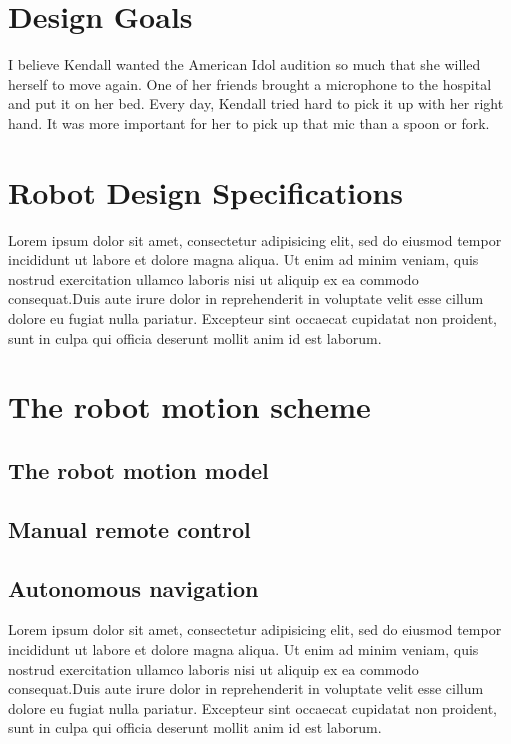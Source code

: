 \documentclass[twocolumn]{article}
\begin{document}
    \section{Design Goals}
    I believe Kendall wanted the American Idol audition so much that she willed herself to move again. One of her friends brought a microphone to the hospital and put it on her bed. Every day, Kendall tried hard to pick it up with her right hand. It was more important for her to pick up that mic than a spoon or fork.
    
    \section{Robot Design Specifications}
        Lorem ipsum dolor sit amet, consectetur adipisicing elit, sed do eiusmod
        tempor incididunt ut labore et dolore magna aliqua. Ut enim ad minim veniam,
        quis nostrud exercitation ullamco laboris nisi ut aliquip ex ea commodo
        consequat.Duis aute irure dolor in reprehenderit in voluptate velit esse
        cillum dolore eu fugiat nulla pariatur. Excepteur sint occaecat cupidatat non
        proident, sunt in culpa qui officia deserunt mollit anim id est laborum.
    
    \section{The robot motion scheme}
    \subsection{The robot motion model}
    \subsection{Manual remote control}
    \subsection{Autonomous navigation}
        Lorem ipsum dolor sit amet, consectetur adipisicing elit, sed do eiusmod
        tempor incididunt ut labore et dolore magna aliqua. Ut enim ad minim veniam,
        quis nostrud exercitation ullamco laboris nisi ut aliquip ex ea commodo
        consequat.Duis aute irure dolor in reprehenderit in voluptate velit esse
        cillum dolore eu fugiat nulla pariatur. Excepteur sint occaecat cupidatat non
        proident, sunt in culpa qui officia deserunt mollit anim id est laborum.
    
\end{document}

